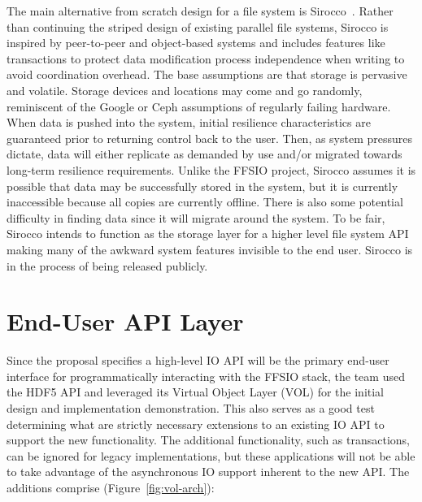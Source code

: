 \documentclass[conference]{IEEEtran} \pdfpagewidth=8.5in
\begin{document}
The main alternative from scratch design for a file system is
Sirocco~\cite{sirocco,curry:2016:sirocco}. Rather than continuing the striped
design of existing parallel file systems, Sirocco is inspired by peer-to-peer
and object-based systems and includes features like transactions to protect
data modification process independence when writing to avoid coordination
overhead.  The base assumptions are that storage is pervasive and volatile.
Storage devices and locations may come and go randomly, reminiscent of the
Google or Ceph assumptions of regularly failing hardware. When data is pushed
into the system, initial resilience characteristics are guaranteed prior to
returning control back to the user. Then, as system pressures dictate, data
will either replicate as demanded by use and/or migrated towards long-term
resilience requirements.  Unlike the FFSIO project, Sirocco assumes it is
possible that data may be successfully stored in the system, but it is
currently inaccessible because all copies are currently offline. There is also
some potential difficulty in finding data since it will migrate around the
system. To be fair, Sirocco intends to function as the storage layer for a
higher level file system API making many of the awkward system features
invisible to the end user. Sirocco is in the process of being released
publicly.

\section{End-User API Layer}
\label{sec:end-user}

Since the proposal specifies a high-level IO API will be the primary end-user
interface for programmatically interacting with the FFSIO stack, the team used
the HDF5 API and leveraged its Virtual Object Layer (VOL) for the initial
design and implementation demonstration. This also serves as a good test
determining what are strictly necessary extensions to an existing IO API to
support the new functionality.  The additional functionality, such as
transactions, can be ignored for legacy implementations, but these applications
will not be able to take advantage of the asynchronous IO support inherent to
the new API.  The additions comprise (Figure~\ref{fig:vol-arch}):
\end{document}
